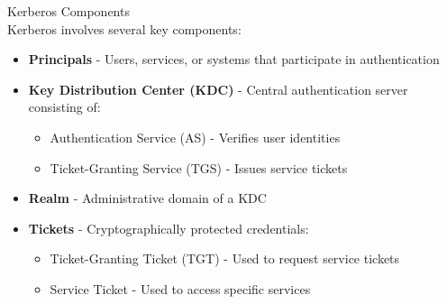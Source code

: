 \begin{concept}{Kerberos Components}\\
Kerberos involves several key components:
\begin{itemize}
    \item \textbf{Principals} - Users, services, or systems that participate in authentication
    \item \textbf{Key Distribution Center (KDC)} - Central authentication server consisting of:
    \begin{itemize}
        \item Authentication Service (AS) - Verifies user identities
        \item Ticket-Granting Service (TGS) - Issues service tickets
    \end{itemize}
    \item \textbf{Realm} - Administrative domain of a KDC
    \item \textbf{Tickets} - Cryptographically protected credentials:
    \begin{itemize}
        \item Ticket-Granting Ticket (TGT) - Used to request service tickets
        \item Service Ticket - Used to access specific services
    \end{itemize}
\end{itemize}
\end{concept}

